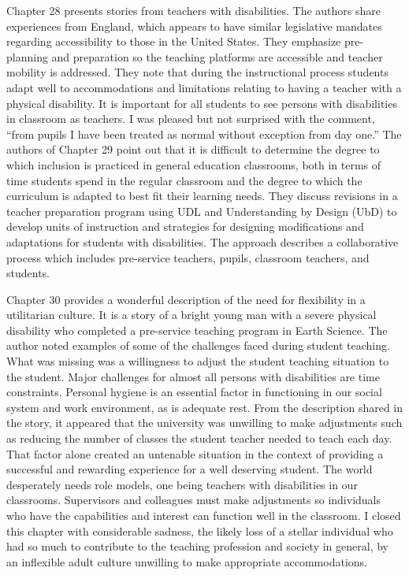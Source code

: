 \documentclass[11.5pt]{sig-alternate} %
\begin{document}
\begin{large}
Chapter 28 presents stories from teachers with disabilities.  The authors share experiences from England, which appears to have similar legislative mandates regarding accessibility to those in the United States.  They emphasize pre-planning and preparation so the teaching platforms are accessible and teacher mobility is addressed.  They note that during the instructional process students adapt well to accommodations and limitations relating to having a teacher with a physical disability.  It is important for all students to see persons with disabilities in classroom as teachers.  I was pleased but not surprised with the comment, “from pupils I have been treated as normal without exception from day one.”  The authors of Chapter 29 point out that it is difficult to determine the degree to which inclusion is practiced in general education classrooms, both in terms of time students spend in the regular classroom and the degree to which the curriculum is adapted to best fit their learning needs.  They discuss revisions in a teacher preparation program using UDL and Understanding by Design (UbD) to develop units of instruction and strategies for designing modifications and adaptations for students with disabilities. The approach describes a collaborative process which includes pre-service teachers, pupils, classroom teachers, and students. 

Chapter 30 provides a wonderful description of the need for flexibility in a utilitarian culture.  It is a story of a bright young man with a severe physical disability who completed a pre-service teaching program in Earth Science.   The author noted examples of some of the challenges faced during student teaching.  What was missing was a willingness to adjust the student teaching situation to the student.  Major challenges for almost all persons with disabilities are time constraints. Personal hygiene is an essential factor in functioning in our social system and work environment, as is adequate rest.  From the description shared in the story, it appeared that the university was unwilling to make adjustments such as reducing the number of classes the student teacher needed to teach each day. That factor alone created an untenable situation in the context of providing a successful and rewarding experience for a well deserving student.  The world desperately needs role models, one being teachers with disabilities in our classrooms.  Supervisors and colleagues must make adjustments so individuals who have the capabilities and interest can function well in the classroom.  I closed this chapter with considerable sadness, the likely loss of a stellar individual who had so much to contribute to the teaching profession and society in general, by an inflexible adult culture unwilling to make appropriate accommodations.


\end{large}
\end{document}

